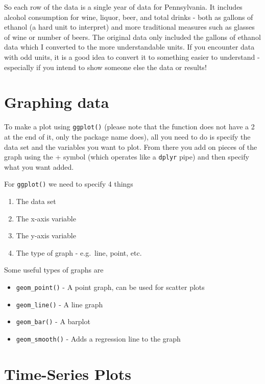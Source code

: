 \documentclass[
]{krantz}
\providecommand{\tightlist}{%
  \setlength{\itemsep}{0pt}\setlength{\parskip}{0pt}}
\begin{document}
So each row of the data is a single year of data for Pennsylvania. It includes alcohol consumption for wine, liquor, beer, and total drinks - both as gallons of ethanol (a hard unit to interpret) and more traditional measures such as glasses of wine or number of beers. The original data only included the gallons of ethanol data which I converted to the more understandable units. If you encounter data with odd units, it is a good idea to convert it to something easier to understand - especially if you intend to show someone else the data or results!

\hypertarget{graphing-data}{%
\section{Graphing data}\label{graphing-data}}

To make a plot using \texttt{ggplot()} (please note that the function does not have a 2 at the end of it, only the package name does), all you need to do is specify the data set and the variables you want to plot. From there you add on pieces of the graph using the + symbol (which operates like a \texttt{dplyr} pipe) and then specify what you want added.

For \texttt{ggplot()} we need to specify 4 things

\begin{enumerate}
\def\labelenumi{\arabic{enumi}.}
\tightlist
\item
  The data set
\item
  The x-axis variable
\item
  The y-axis variable
\item
  The type of graph - e.g.~line, point, etc.
\end{enumerate}

Some useful types of graphs are

\begin{itemize}
\tightlist
\item
  \texttt{geom\_point()} - A point graph, can be used for scatter plots
\item
  \texttt{geom\_line()} - A line graph
\item
  \texttt{geom\_bar()} - A barplot
\item
  \texttt{geom\_smooth()} - Adds a regression line to the graph
\end{itemize}

\hypertarget{time-series-plots}{%
\section{Time-Series Plots}\label{time-series-plots}}
\end{document}

